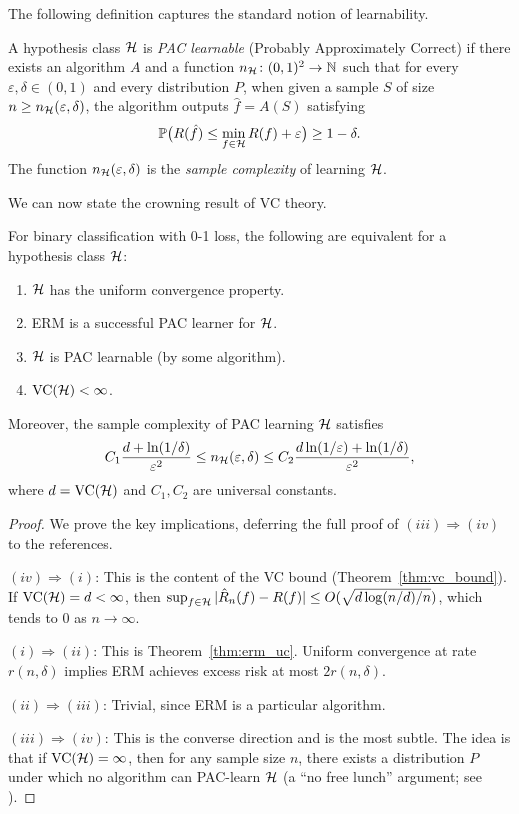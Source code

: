 \documentclass[11pt,a4paper]{article}
\begin{document}
The following definition captures the standard notion of learnability.

\begin{definition}
\label{def:pac}
A hypothesis class $\mathcal{H}$ is \emph{PAC learnable} (Probably
Approximately Correct) if there exists an algorithm $A$ and a
function $n_{\mathcal{H}} \colon (0,1)^2 \to \mathbb{N}$ such that for every
$\varepsilon, \delta \in (0,1)$ and every distribution $P$, when
given a sample $S$ of size $n \geq n_{\mathcal{H}}(\varepsilon, \delta)$,
the algorithm outputs $\hat{f} = A(S)$ satisfying
\[
    \mathbb{P}\bigl(R(\hat{f}) \leq \min_{f \in \mathcal{H}} R(f)
    + \varepsilon\bigr) \geq 1 - \delta.
\]
The function $n_{\mathcal{H}}(\varepsilon, \delta)$ is the \emph{sample
complexity} of learning $\mathcal{H}$.
\end{definition}

We can now state the crowning result of VC theory.

\begin{theorem}
\label{thm:ftsl}
For binary classification with 0-1 loss, the following are equivalent
for a hypothesis class $\mathcal{H}$:
\begin{enumerate}[nosep,label=(\roman*)]
    \item $\mathcal{H}$ has the uniform convergence property.
    \item ERM is a successful PAC learner for $\mathcal{H}$.
    \item $\mathcal{H}$ is PAC learnable (by some algorithm).
    \item $\operatorname{VC}(\mathcal{H}) < \infty$.
\end{enumerate}
Moreover, the sample complexity of PAC learning $\mathcal{H}$ satisfies
\[
    C_1 \frac{d + \ln(1/\delta)}{\varepsilon^2}
    \leq n_{\mathcal{H}}(\varepsilon, \delta)
    \leq C_2 \frac{d \ln(1/\varepsilon) + \ln(1/\delta)}{\varepsilon^2},
\]
where $d = \operatorname{VC}(\mathcal{H})$ and $C_1, C_2$ are universal constants.
\end{theorem}

\begin{proof}
We prove the key implications, deferring the full proof of $(iii)
\Rightarrow (iv)$ to the references.

\emph{$(iv) \Rightarrow (i)$}: This is the content of the VC bound
(Theorem~\ref{thm:vc_bound}).  If $\operatorname{VC}(\mathcal{H}) = d < \infty$, then
$\sup_{f \in \mathcal{H}} |\hat{R}_n(f) - R(f)|
\leq O(\sqrt{d \log(n/d) / n})$, which tends to $0$ as
$n \to \infty$.

\emph{$(i) \Rightarrow (ii)$}: This is Theorem~\ref{thm:erm_uc}.
Uniform convergence at rate $r(n, \delta)$ implies ERM achieves
excess risk at most $2r(n, \delta)$.

\emph{$(ii) \Rightarrow (iii)$}: Trivial, since ERM is a particular
algorithm.

\emph{$(iii) \Rightarrow (iv)$}: This is the converse direction and
is the most subtle.  The idea is that if $\operatorname{VC}(\mathcal{H}) = \infty$,
then for any sample size $n$, there exists a distribution $P$ under
which no algorithm can PAC-learn $\mathcal{H}$ (a ``no free lunch''
argument; see \citet[Theorem~5.1]{shalev2014}).
\end{proof}
\end{document}
